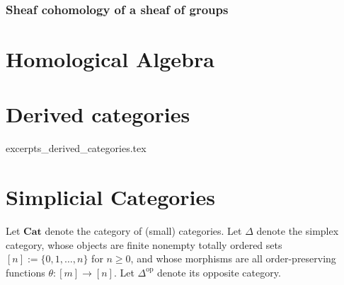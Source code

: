 \subsubsection{Sheaf cohomology of a sheaf of groups}










\section{Homological Algebra}












\section{Derived categories}

{excerpts_derived_categories.tex}


\section{Simplicial Categories}

\TODO{}

\begin{notation}
Let $\mathbf{Cat}$ denote the category of (small) categories.  
Let $\Delta$ denote the simplex category, whose objects are finite nonempty totally ordered sets $[n] := \{0, 1, \dots, n\}$ for $n \ge 0$, and whose morphisms are all order-preserving functions $\theta : [m] \to [n]$.  
Let $\Delta^{\mathrm{op}}$ denote its opposite category.
\end{notation}


